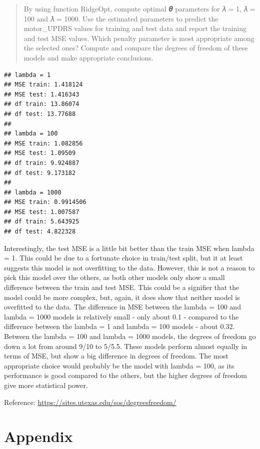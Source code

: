 \documentclass[
]{article}
\begin{document}
\begin{quote}
By using function RidgeOpt, compute optimal 𝜽 parameters for 𝜆 = 1, 𝜆 =
100 and 𝜆 = 1000. Use the estimated parameters to predict the
motor\_UPDRS values for training and test data and report the training
and test MSE values. Which penalty parameter is most appropriate among
the selected ones? Compute and compare the degrees of freedom of these
models and make appropriate conclusions.
\end{quote}

\begin{verbatim}
## lambda = 1
## MSE train: 1.418124
## MSE test: 1.416343
## df train: 13.86074
## df test: 13.77688
## 
## lambda = 100
## MSE train: 1.082856
## MSE test: 1.09509
## df train: 9.924887
## df test: 9.173182
## 
## lambda = 1000
## MSE train: 0.9914506
## MSE test: 1.007587
## df train: 5.643925
## df test: 4.822328
\end{verbatim}

Interestingly, the test MSE is a little bit better than the train MSE
when lambda = 1. This could be due to a fortunate choice in train/test
split, but it at least suggests this model is not overfitting to the
data. However, this is not a reason to pick this model over the others,
as both other models only show a small difference between the train and
test MSE. This could be a signifier that the model could be more
complex, but, again, it does show that neither model is overfitted to
the data. The difference in MSE between the lambda = 100 and lambda =
1000 models is relatively small - only about 0.1 - compared to the
difference between the lambda = 1 and lambda = 100 models - about 0.32.
Between the lambda = 100 and lambda = 1000 models, the degrees of
freedom go down a lot from around 9/10 to 5/5.5. These models perform
almost equally in terms of MSE, but show a big difference in degrees of
freedom. The most appropriate choice would probably be the model with
lambda = 100, as its performance is good compared to the others, but the
higher degrees of freedom give more statistical power.

Reference: \url{https://sites.utexas.edu/sos/degreesfreedom/}

\hypertarget{appendix}{%
\section{Appendix}\label{appendix}}
\end{document}
